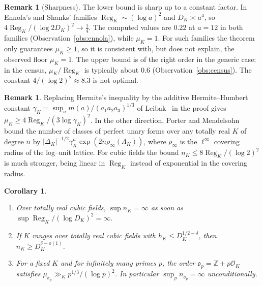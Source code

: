 \documentclass[11pt,reqno]{amsart}
\theoremstyle{plain}
\newtheorem{corollary}[theorem]{Corollary}
\theoremstyle{definition}
\newtheorem{remark}[theorem]{Remark}
\newcommand{\Z}{\mathbb{Z}}
\newcommand{\Reg}{\operatorname{Reg}}
\newcommand{\Ok}{\mathfrak{o}}
\newcommand{\nK}{n_K}
\newcommand{\muK}{\mu_K}
\begin{document}
\begin{remark}[Sharpness]\label{rem:sharp}
The lower bound is sharp up to a constant factor. In Ennola's and Shanks' families $\Reg_K\sim(\log a)^2$ and
$D_K\asymp a^4$, so $4\Reg_K/(\log2D_K)^2\to\tfrac14$. The computed values are $0.22$ at $a=12$ in both
families (Observation~\ref{obs:ennola}), while $\muK=1$. For such families the theorem only guarantees $\muK\ge1$, so it is consistent with, but does not
explain, the observed floor $\muK=1$. The
upper bound is of the right order in the generic case: in the census, $\muK/\Reg_K$ is typically about $0.6$
(Observation~\ref{obs:census}). The constant $4/(\log2)^2\approx8.3$ is not optimal.
\end{remark}

\begin{remark}\label{rem:hermitehumbert}
Replacing Hermite's inequality by the additive Hermite--Humbert constant
$\gamma_K=\sup_a m(a)/(a_1a_2a_3)^{1/3}$ of Leibak~\cite{Leibak} in the proof gives
$\muK\ge4\Reg_K/(3\log\gamma_K)^2$. In the other direction, Porter and Mendelsohn~\cite{PM} bound the number
of classes of perfect unary forms over any totally real $K$ of degree $n$ by
$|\Delta_K|^{-1/2}\gamma_K^n\exp(2n\rho_\infty(\Lambda_K))$, where $\rho_\infty$ is the $\ell^\infty$ covering
radius of the log--unit lattice. For cubic fields the bound $\nK\le8\Reg_K/(\log2)^2$ is much stronger, being
linear in $\Reg_K$ instead of exponential in the covering radius.
\end{remark}

\begin{corollary}\label{cor:unbounded}
\begin{enumerate}[label=\textup{(\alph*)},leftmargin=2.2em]
\item Over totally real cubic fields, $\sup\nK=\infty$ as soon as $\sup\Reg_K/(\log D_K)^2=\infty$.
\item If $K$ ranges over totally real cubic fields with $h_K\le D_K^{1/2-\delta}$, then
$\nK\ge D_K^{\delta-o(1)}$.
\item For a fixed $K$ and for infinitely many primes $p$, the order $\Ok_p=\Z+p\mathcal O_K$ satisfies
$\mu_{\Ok_p}\gg_K p^{1/3}/(\log p)^2$. In particular $\sup_p n_{\Ok_p}=\infty$ unconditionally.
\end{enumerate}
\end{corollary}
\end{document}
